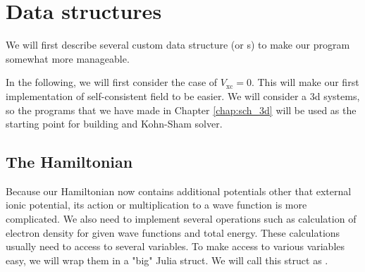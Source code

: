 \section{Data structures}

We will first describe several custom data structure (or s)
to make our program somewhat more manageable.

In the following, we will first consider the case of
$V_{\mathrm{xc}}=0$. This will make our first implementation
of self-consistent field to be easier.
We will consider a 3d systems, so the programs
that we have made in Chapter \ref{chap:sch_3d} will be used as the starting point
for building and Kohn-Sham solver.

\subsection{The Hamiltonian}

Because our Hamiltonian now contains additional potentials other that external ionic
potential, its action or multiplication to a wave function is
more complicated. We also need to implement several operations such as calculation
of electron density for given wave functions and total energy.
These calculations usually need to access to several variables. To make access to various
variables easy, we will wrap them in a "big" Julia struct. We will call this struct
as .

